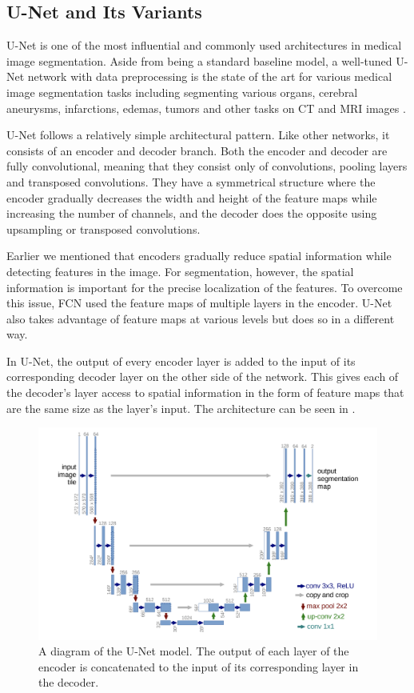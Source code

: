  \subsection{U-Net and Its Variants}

U-Net \cite{ronnebergerUNetConvolutionalNetworks2015d} is one of the most influential and commonly used architectures in medical image segmentation. Aside from being a standard baseline model, a well-tuned U-Net network with data preprocessing is the state of the art for various medical image segmentation tasks including segmenting various organs, cerebral aneurysms, infarctions, edemas, tumors and other tasks on CT and MRI images \cite{isenseeNnUNetSelfconfiguringMethod2021}.

U-Net follows a relatively simple architectural pattern. Like other networks, it consists of an encoder and decoder branch. Both the encoder and decoder are fully convolutional, meaning that they consist only of convolutions, pooling layers and transposed convolutions. They have a symmetrical structure where the encoder gradually decreases the width and height of the feature maps while increasing the number of channels, and the decoder does the opposite using upsampling or transposed convolutions.

Earlier we mentioned that encoders gradually reduce spatial information while detecting features in the image. For segmentation, however, the spatial information is important for the precise localization of the features. To overcome this issue, FCN used the feature maps of multiple layers in the encoder. U-Net also takes advantage of feature maps at various levels but does so in a different way.

In U-Net, the output of every encoder layer is added to the input of its corresponding decoder layer on the other side of the network. This gives each of the decoder's layer access to spatial information in the form of feature maps that are the same size as the layer's input. The architecture can be seen in .

\begin{figure}[h!]
 \centering
 \includegraphics[width=0.8\linewidth]{images/unet-arch}
 \caption{A diagram of the U-Net model. The output of each layer of the encoder is concatenated to the input of its corresponding layer in the decoder. \cite{ronnebergerUNetConvolutionalNetworks2015d}}
 \label{fig:unet-arch}
 \end{figure}

